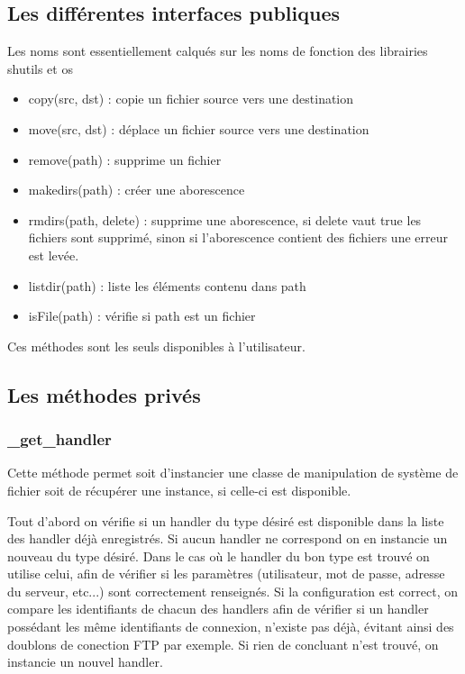 \newpage

\subsection*{Les différentes interfaces publiques}
Les noms sont essentiellement calqués sur les noms de fonction des librairies shutils et os

\begin{itemize}
\item copy(src, dst) : copie un fichier source vers une destination
\item move(src, dst) : déplace un fichier source vers une destination
\item remove(path) : supprime un fichier
\item makedirs(path) : créer une aborescence
\item rmdirs(path, delete) : supprime une aborescence, si delete vaut true les fichiers sont supprimé, sinon si l'aborescence contient des fichiers une erreur est levée.
\item listdir(path) : liste les éléments contenu dans path
\item isFile(path) : vérifie si path est un fichier 
\end{itemize}

Ces méthodes sont les seuls disponibles à l'utilisateur.

\subsection*{Les méthodes privés}
\subsubsection*{\_get\_handler}
Cette méthode permet soit d'instancier une classe de manipulation de système de fichier soit de récupérer une instance, si celle-ci est disponible.

Tout d'abord on vérifie si un handler du type désiré est disponible dans la liste des handler déjà enregistrés. Si aucun handler ne correspond on en instancie un nouveau du type désiré.
Dans le cas où le handler du bon type est trouvé on utilise celui, afin de vérifier si les paramètres (utilisateur, mot de passe, adresse du serveur, etc...) sont correctement renseignés.
Si la configuration est correct, on compare les identifiants de chacun des handlers afin de vérifier si un handler possédant les même identifiants de connexion, n'existe pas déjà, évitant ainsi des doublons de conection FTP par exemple.
Si rien de concluant n'est trouvé, on instancie un nouvel handler.

